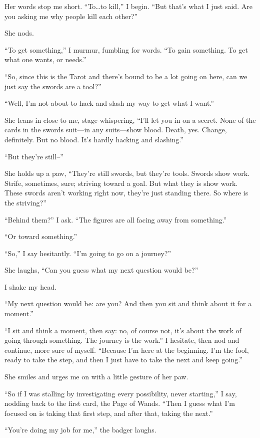 Her words stop me short. ``To\ldots{}to kill,'' I begin. ``But that's what I just said. Are you asking me why people kill each other?''

She nods.

``To get something,'' I murmur, fumbling for words. ``To gain something. To get what one wants, or needs.''

``So, since this is the Tarot and there's bound to be a lot going on here, can we just say the swords are a tool?''

``Well, I'm not about to hack and slash my way to get what I want.''

She leans in close to me, stage-whispering, ``I'll let you in on a secret. None of the cards in the swords suit---in any suits---show blood. Death, yes. Change, definitely. But no blood. It's hardly hacking and slashing.''

``But they're still--''

She holds up a paw, ``They're still swords, but they're tools. Swords show work. Strife, sometimes, sure; striving toward a goal. But what they is show work. These swords aren't working right now, they're just standing there. So where is the striving?''

``Behind them?'' I ask. ``The figures are all facing away from something.''

``Or toward something.''

``So,'' I say hesitantly. ``I'm going to go on a journey?''

She laughs, ``Can you guess what my next question would be?''

I shake my head.

``My next question would be: are you? And then you sit and think about it for a moment.''

``I sit and think a moment, then say: no, of course not, it's about the work of going through something. The journey is the work.'' I hesitate, then nod and continue, more sure of myself. ``Because I'm here at the beginning. I'm the fool, ready to take the step, and then I just have to take the next and keep going.''

She smiles and urges me on with a little gesture of her paw.

``So if I was stalling by investigating every possibility, never starting,'' I say, nodding back to the first card, the Page of Wands. ``Then I guess what I'm focused on is taking that first step, and after that, taking the next.''

``You're doing my job for me,'' the badger laughs.

